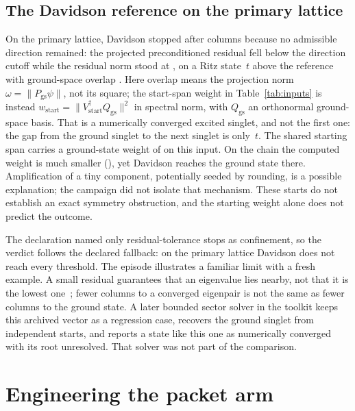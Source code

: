 \documentclass[aps,pra,reprint,superscriptaddress,nofootinbib,floatfix,
  showkeys,raggedbottom]{revtex4-2}
\begin{document}
\subsection{The Davidson reference on the primary lattice}
\label{sec:davidson}

On the primary lattice, Davidson stopped after \pkPrimaryDavidsonStopColumns{}
columns because no admissible direction remained: the projected
preconditioned residual fell below the direction cutoff while the residual
norm stood at \pkPrimaryDavidsonResidual{}, on a Ritz state
\pkPrimaryDavidsonError{}\,$t$ above the reference with ground-space overlap
\pkPrimaryDavidsonOverlap{}. Here overlap means the projection norm
$\omega=\lVert P_{\mathrm{gs}}\psi\rVert$, not its square; the start-span
weight in Table~\ref{tab:inputs} is instead
$w_{\mathrm{start}}=\lVert V_{\mathrm{start}}^\dagger Q_{\mathrm{gs}}\rVert^2$
in spectral norm, with $Q_{\mathrm{gs}}$ an orthonormal ground-space basis.
That is a numerically converged excited singlet,
and not the first one: the gap from the ground singlet to
the next singlet is only \pkPrimaryGap{}\,$t$. The shared starting span
carries a ground-state weight of \pkPrimaryStartWeight{} on this input. On the
chain the computed weight is much smaller (\pkChainStartWeight{}), yet Davidson
reaches the ground state there. Amplification of a tiny component, potentially
seeded by rounding, is a possible explanation; the campaign did not isolate
that mechanism. These starts do not establish an exact symmetry obstruction,
and the starting weight alone does not predict the outcome.

The declaration named only residual-tolerance stops as confinement, so the
verdict follows the declared fallback: on the primary lattice Davidson does not
reach every threshold. The episode illustrates a familiar limit with a fresh
example. A small residual guarantees that an eigenvalue lies nearby, not that
it is the lowest one~\cite{weinstein1934modified}; fewer columns to a
converged eigenpair is not the same as fewer columns to the ground state. A
later bounded sector solver in the toolkit keeps this archived vector as a
regression case, recovers the ground singlet from independent starts, and
reports a state like this one as numerically converged with its root
unresolved. That solver was not part of the comparison.

\section{Engineering the packet arm}
\label{sec:ledger}
\end{document}

